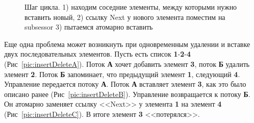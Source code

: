 \documentclass[12pt]{article}
\begin{document}
{\begin{figure}[h]
					\caption{Шаг цикла. 1) находим соседние элементы, между которыми нужно вставить новый, 2) ссылку Next у нового элемента поместим на subsessor 3) пытаемся атомарно вставить}
					\label{pic:whileCas}
				\end{figure}
				\par Еще одна проблема может возникнуть при одновременным удалении и вставке двух последовательных элементов. Пусть есть список \textbf{1}-\textbf{2}-\textbf{4} (Рис~\ref{pic:insertDeleteA}). Поток \textbf{А} хочет добавить элемент \textbf{3}, поток \textbf{Б} удалить элемент \textbf{2}. Поток \textbf{Б} запоминает, что предыдущий элемент \textbf{1}, следующий \textbf{4}. Управление передается потоку \textbf{А}. Поток \textbf{А} вставляет элемент \textbf{3}, как это было описано ранее (Рис~\ref{pic:insertDeleteB}). Управление возвращается к потоку \textbf{Б}. Он атомарно заменяет ссылку <<Next>> у элемента \textbf{1} на элемент \textbf{4} (Рис~\ref{pic:insertDeleteC}). В итоге элемент \textbf{3} <<потерялся>>.
				\begin{figure}[h!]
					\begin{minipage}[h]{0.45\linewidth}
						\center  {}
					\end{minipage}
					\hfill
					\begin{minipage}[h]{0.45\linewidth}
						\center {}
					\end{minipage}
					\vfill
					\begin{minipage}[h]{0.45\linewidth}
						\center {}
\end{minipage}
\end{figure}}
\end{document}
